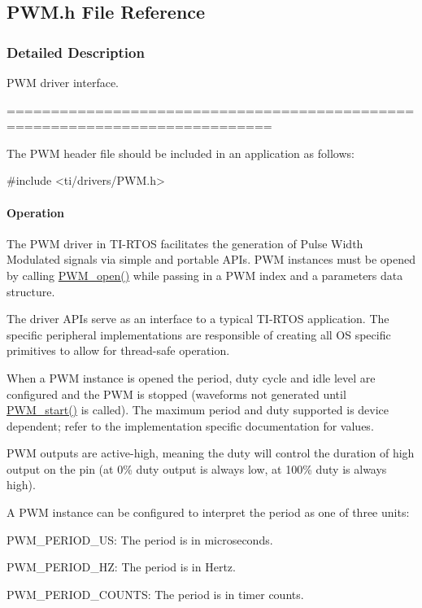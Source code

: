 \subsection{P\+W\+M.\+h File Reference}
\label{_p_w_m_8h}


\subsubsection{Detailed Description}
P\+W\+M driver interface. 

============================================================================

The P\+W\+M header file should be included in an application as follows\+: 
\begin{DoxyCode}
\textcolor{preprocessor}{#include <ti/drivers/PWM.h>}
\end{DoxyCode}


\paragraph*{Operation}

The P\+W\+M driver in T\+I-\/\+R\+T\+O\+S facilitates the generation of Pulse Width Modulated signals via simple and portable A\+P\+Is. P\+W\+M instances must be opened by calling \hyperlink{_p_w_m_8h_ac963beab0c5c6901bf852f175028aeaf}{P\+W\+M\+\_\+open()} while passing in a P\+W\+M index and a parameters data structure.

The driver A\+P\+Is serve as an interface to a typical T\+I-\/\+R\+T\+O\+S application. The specific peripheral implementations are responsible of creating all O\+S specific primitives to allow for thread-\/safe operation.

When a P\+W\+M instance is opened the period, duty cycle and idle level are configured and the P\+W\+M is stopped (waveforms not generated until \hyperlink{_p_w_m_8h_aa1bd0cc3f0fa52879422fca74d254378}{P\+W\+M\+\_\+start()} is called). The maximum period and duty supported is device dependent; refer to the implementation specific documentation for values.

P\+W\+M outputs are active-\/high, meaning the duty will control the duration of high output on the pin (at 0\% duty output is always low, at 100\% duty is always high).

A P\+W\+M instance can be configured to interpret the period as one of three units\+:
\begin{DoxyItemize}
\item P\+W\+M\+\_\+\+P\+E\+R\+I\+O\+D\+\_\+\+U\+S\+: The period is in microseconds.
\item P\+W\+M\+\_\+\+P\+E\+R\+I\+O\+D\+\_\+\+H\+Z\+: The period is in Hertz.
\item P\+W\+M\+\_\+\+P\+E\+R\+I\+O\+D\+\_\+\+C\+O\+U\+N\+T\+S\+: The period is in timer counts.
\end{DoxyItemize}

